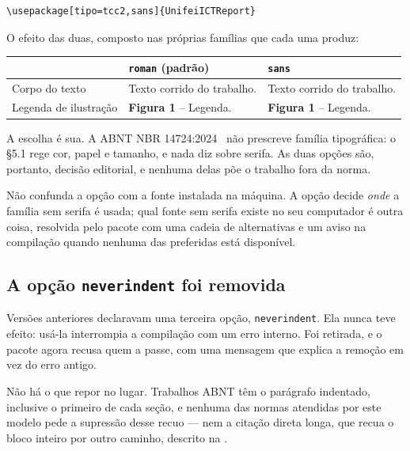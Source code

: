 \begin{Verbatim}[fontsize=\small]
\usepackage[tipo=tcc2,sans]{UnifeiICTReport}
\end{Verbatim}

O efeito das duas, composto nas próprias famílias que cada uma produz:

\begin{center}
    \begin{tabular}{lll}
        \toprule
                                    & \texttt{roman} (padrão)                        & \texttt{sans}                                  \\
        \midrule
        Corpo do texto              & \rmfamily Texto corrido do trabalho.           & \sffamily Texto corrido do trabalho.           \\
        Legenda de ilustração       & \sffamily\small\textbf{Figura 1} -- Legenda.   & \rmfamily\small\textbf{Figura 1} -- Legenda.   \\
        \bottomrule
    \end{tabular}
\end{center}

A escolha é sua. A ABNT NBR 14724:2024~\cite{nbr14724:2024} não prescreve família tipográfica: o
§5.1 rege cor, papel e tamanho, e nada diz sobre serifa. As duas opções são, portanto, decisão
editorial, e nenhuma delas põe o trabalho fora da norma.

Não confunda a opção com a fonte instalada na máquina. A opção decide \emph{onde} a família sem
serifa é usada; qual fonte sem serifa existe no seu computador é outra coisa, resolvida pelo pacote
com uma cadeia de alternativas e um aviso na compilação quando nenhuma das preferidas está
disponível.

\subsection{A opção \texttt{neverindent} foi removida}\label{ssc:neverindent}

Versões anteriores declaravam uma terceira opção, \texttt{neverindent}. Ela nunca teve efeito: usá-la
interrompia a compilação com um erro interno. Foi retirada, e o pacote agora recusa quem a passe,
com uma mensagem que explica a remoção em vez do erro antigo.

Não há o que repor no lugar. Trabalhos ABNT têm o parágrafo indentado, inclusive o primeiro de cada
seção, e nenhuma das normas atendidas por este modelo pede a supressão desse recuo --- nem a citação
direta longa, que recua o bloco inteiro por outro caminho, descrito na .

